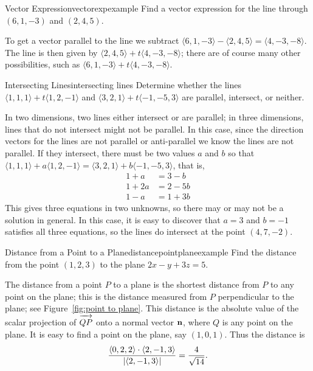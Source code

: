 \begin{example}{Vector Expression}{vectorexpexample}
Find a vector expression for the line through $(6,1,-3)$ and
$(2,4,5)$.
\end{example}
\begin{solution}
To get a vector parallel to the line we subtract $\langle
6,1,-3\rangle-\langle2,4,5\rangle=\langle 4,-3,-8\rangle$.  The line
is then given by $\langle 2,4,5\rangle+t\langle 4,-3,-8\rangle$; there
are of course many other possibilities, such as $\langle
6,1,-3\rangle+t\langle 4,-3,-8\rangle$.
\end{solution}

\begin{example}{Intersecting Lines}{intersecting lines}
Determine whether the lines $\langle 1,1,1\rangle+t\langle 1,2,-1\rangle$ and
$\langle 3,2,1\rangle+t\langle -1,-5,3\rangle$ are parallel, intersect, or
neither.
\end{example}
\begin{solution}
In two dimensions, two lines either intersect or are parallel; in
three dimensions, lines that do not intersect might not be parallel.
In this case, since the direction vectors for the lines are not
parallel or anti-parallel we know the lines are not parallel.
If they intersect, there must be two values $a$ and $b$ so that
$\langle 1,1,1\rangle+a\langle 1,2,-1\rangle=
\langle 3,2,1\rangle+b\langle -1,-5,3\rangle$, that is, 
\begin{align*}
  1+a&=3-b	\\
  1+2a&=2-5b	\\
  1-a&=1+3b
\end{align*}
This gives three equations in two unknowns, so there may or may not be
a solution in general. In this case, it is easy to discover that $a=3$
and $b=-1$ satisfies all three equations, so the lines do intersect at
the point $(4,7,-2)$.
\end{solution}

\begin{example}{Distance from a Point to a Plane}{distancepointplaneexample}
Find the distance from the point $(1,2,3)$ to the plane
$2x-y+3z=5$.
\end{example}
\begin{solution}
The distance from a point $P$ to a plane is the shortest
distance from $P$ to any point on the plane; this is the
distance measured from $P$ perpendicular to the plane; see
Figure~\ref{fig:point to plane}. This distance 
is the absolute value of the scalar projection of 
$\overrightarrow{\strut QP}$
onto a normal vector $\bf n$, where $Q$ is any point on the plane.
It is easy to find a point on the plane, say $(1,0,1)$.
Thus the distance is
$$
  {\langle 0,2,2\rangle\cdot\langle 2,-1,3\rangle\over|\langle 2,-1,3\rangle|}=
  {4\over\sqrt{14}}.
$$
\end{solution}

